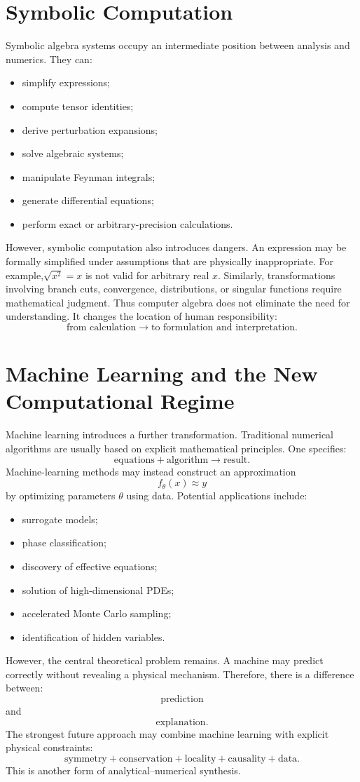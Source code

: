 \section{ Symbolic Computation}
Symbolic algebra systems occupy an intermediate position between analysis and numerics.
They can:
\begin{itemize}
\item simplify expressions;
\item compute tensor identities;
\item derive perturbation expansions;
\item solve algebraic systems;
\item manipulate Feynman integrals;
\item generate differential equations;
\item perform exact or arbitrary-precision calculations.
\end{itemize}
However, symbolic computation also introduces dangers.
An expression may be formally simplified under assumptions that are physically inappropriate.
For example,$\sqrt{x^2}=x$ is not valid for arbitrary real $x$.
Similarly, transformations involving branch cuts, convergence, distributions,
or singular functions require mathematical judgment.
Thus computer algebra does not eliminate the need for understanding.
It changes the location of human responsibility:
\[\text{from calculation}\rightarrow\text{to formulation and interpretation}.\]

\section{ Machine Learning and the New Computational Regime}
Machine learning introduces a further transformation.
Traditional numerical algorithms are usually based on explicit mathematical principles. One specifies:
\[\text{equations}+\text{algorithm}\rightarrow\text{result}.\]
Machine-learning methods may instead construct an approximation
\[f_\theta(x)\approx y\]
by optimizing parameters $\theta$ using data.
Potential applications include:
\begin{itemize}
\item surrogate models;
\item phase classification;
\item discovery of effective equations;
\item solution of high-dimensional PDEs;
\item accelerated Monte Carlo sampling;
\item identification of hidden variables.
\end{itemize}
However, the central theoretical problem remains.
A machine may predict correctly without revealing a physical mechanism.
Therefore, there is a difference between:
\[\text{prediction}\]
and
\[\text{explanation}.\]
The strongest future approach may combine machine learning with explicit physical constraints:
\[\text{symmetry}+\text{conservation}+\text{locality}+\text{causality}+\text{data}.\]
This is another form of analytical--numerical synthesis.

